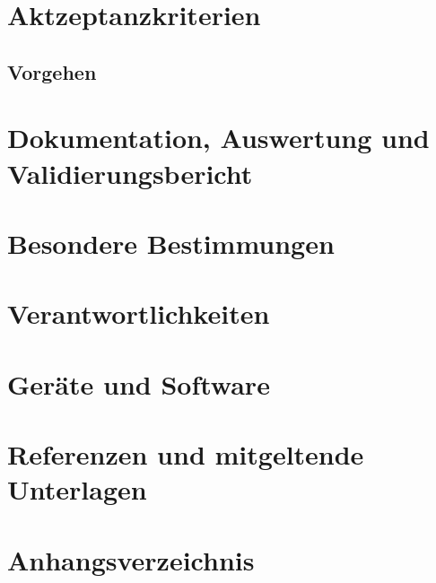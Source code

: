 \documentclass[11pt, a4paper]{article}
\begin{document}
\section{Aktzeptanzkriterien}

\subsection{Vorgehen}

\section{Dokumentation, Auswertung und Validierungsbericht}

\section{Besondere Bestimmungen}

\section{Verantwortlichkeiten}

\section{Geräte und Software}

\section{Referenzen und mitgeltende Unterlagen}

\section{Anhangsverzeichnis}
\end{document}
